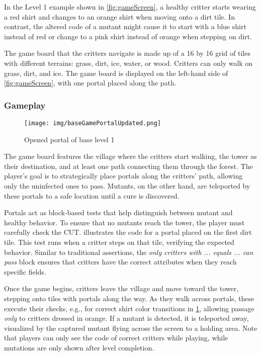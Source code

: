 In the Level 1 example shown in \cref{fig:gameScreen}, a healthy critter starts wearing a red shirt and changes to an orange shirt when moving onto a dirt tile. In contrast, the altered code of a mutant might cause it to start with a blue shirt instead of red or change to a pink shirt instead of orange when stepping on dirt.

The game board that the critters navigate is made up of a 16 by 16 grid of tiles with different terrains: grass, dirt, ice, water, or wood. Critters can only walk on grass, dirt, and ice. The game board is displayed on the left-hand side of \cref{fig:gameScreen}, with one portal placed along the path.

\subsubsection{Gameplay}

\begin{figure}
	\centering
	\texttt{[image: img/baseGamePortalUpdated.png]}
	\caption{Opened portal of base level 1}
	\label{fig:gameWithPortal}
\end{figure}

The game board features the village where the critters start walking, the tower as their destination, and at least one path connecting them through the forest. The player's goal is to strategically place portals along the critters' path, allowing only the uninfected ones to pass. Mutants, on the other hand, are teleported by these portals to a safe location until a cure is discovered.

Portals act as block-based tests that help distinguish between mutant and healthy behavior. To ensure that no mutants reach the tower, the player must carefully check the CUT.  illustrates the code for a portal placed on the first dirt tile. This test runs when a critter steps on that tile, verifying the expected behavior. Similar to traditional assertions, the \textit{only critters with ... equals ... can pass} block ensures that critters have the correct attributes when they reach specific fields.

Once the game begins, critters leave the village and move toward the tower, stepping onto tiles with portals along the way. As they walk across portals, these execute their checks, e.g., for correct shirt color transitions in \cref{fig:gameWithPortal}, allowing passage \textit{only} to critters dressed in orange. If a mutant is detected, it is teleported away, visualized by the captured mutant flying across the screen to a holding area. Note that players can only see the code of correct critters while playing, while mutations are only shown after level completion.

